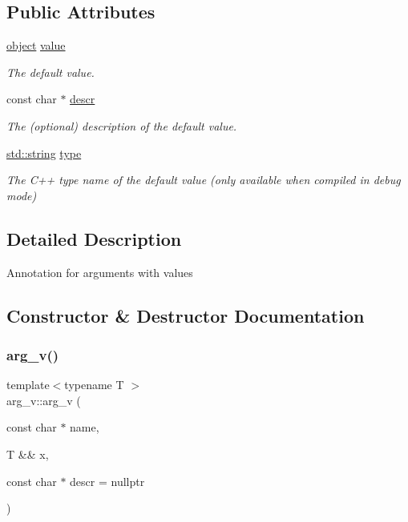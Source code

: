 \subsection*{Public Attributes}
\begin{DoxyCompactItemize}
\item 
\mbox{\hyperlink{classobject}{object}} \mbox{\hyperlink{structarg__v_a3fe738ed6397b48b88244151dab53ee1}{value}}
\begin{DoxyCompactList}\small\item\em The default value. \end{DoxyCompactList}\item 
const char $\ast$ \mbox{\hyperlink{structarg__v_a0a50cfb966acfce71fd61974a31f2a75}{descr}}
\begin{DoxyCompactList}\small\item\em The (optional) description of the default value. \end{DoxyCompactList}\item 
\mbox{\hyperlink{_s_d_l__opengl__glext_8h_ab4ccfaa8ab0e1afaae94dc96ef52dde1}{std\+::string}} \mbox{\hyperlink{structarg__v_a772bc79a04bfa30ab09034927be549ad}{type}}
\begin{DoxyCompactList}\small\item\em The C++ type name of the default value (only available when compiled in debug mode) \end{DoxyCompactList}\end{DoxyCompactItemize}


\subsection{Detailed Description}
Annotation for arguments with values 

\subsection{Constructor \& Destructor Documentation}
\mbox{\label{structarg__v_a7d90c329733699b99eccbb55797d65fb}} 
\subsubsection{\texorpdfstring{arg\_v()}{arg\_v()}\hspace{0.1cm}{\footnotesize\ttfamily [1/2]}}
{\footnotesize\ttfamily template$<$typename T $>$ \\
arg\+\_\+v\+::arg\+\_\+v (\begin{DoxyParamCaption}\item[{const char $\ast$}]{name,  }\item[{T \&\&}]{x,  }\item[{const char $\ast$}]{descr = {\ttfamily nullptr} }\end{DoxyParamCaption})\hspace{0.3cm}{\ttfamily [inline]}}



